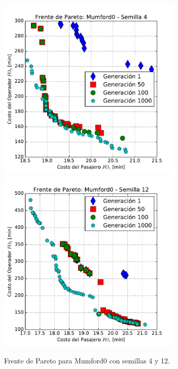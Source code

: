 \begin{figure}[p]
\centering
\includegraphics[width=0.79\textwidth]{img/frente_Mumford0_s4}
\includegraphics[width=0.79\textwidth]{img/frente_Mumford0_s12}
\caption{Frente de Pareto para Mumford0 con semillas 4 y 12.}
\label{fig:paretoMumford1}
\end{figure}

